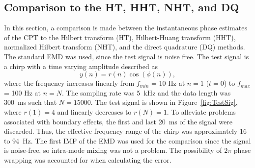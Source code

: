 \documentclass[a4paper]{IEEEtran}
\begin{document}
\subsection{Comparison to the HT, HHT, NHT, and DQ}
In this section, a comparison is made between the instantaneous phase estimates of the CPT to the Hilbert transform (HT), Hilbert-Huang transform (HHT), normalized Hilbert transform (NHT), and the direct quadrature (DQ) methods. The standard EMD was used, since the test signal is noise free. The test signal is a chirp with a time varying amplitude described as
\begin{equation}\label{TestSigNoNoise}
    y(n)=r\left(n\right)\cos\left(\phi\left(n\right)\right),
\end{equation}
where the frequency increases linearly from $f_{min}$ = 10 Hz at $n=1$ ($t=0$) to $f_{max}$ = 100 Hz at $n=N$. The sampling rate was 5~kHz and the data length was 300~ms such that $N = 15000$. The test signal is shown in Figure~\ref{fig:TestSig}, where $r(1) = 4$ and linearly decreases to $r(N) = 1$. To alleviate problems associated with boundary effects, the first and last 20~ms of the signal were discarded. Thus, the effective frequency range of the chirp was approximately 16 to 94~Hz. The first IMF of the EMD was used for the comparison since the signal is noise-free, so intra-mode mixing was not a problem. The possibility of $2\pi$ phase wrapping was accounted for when calculating the error.
\end{document}
